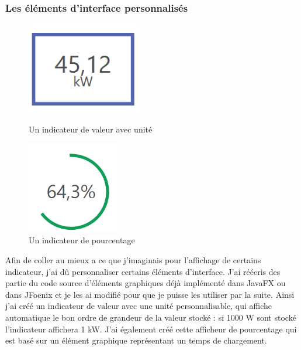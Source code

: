 \subsubsection{Les éléments d'interface personnalisés}
\begin{figure}[h!]
	\begin{minipage}{0.48\textwidth}
		\centering
		\includegraphics[height=4cm]{partie2/images/customcontrol1.png}
		\caption{Un indicateur de valeur avec unité}
	\end{minipage}\hfill
	\begin{minipage}{0.48\textwidth}
		\centering
		\includegraphics[height=4cm]{partie2/images/customcontrol2.png}
		\caption{Un indicateur de pourcentage}
	\end{minipage}\hfill
\end{figure}

Afin de coller au mieux a ce que j'imaginais pour l'affichage de certains indicateur, j'ai dû personnaliser certains éléments d'interface. J'ai réécris des partie du code source d'éléments graphiques déjà implémenté dans JavaFX ou dans JFoenix et je les ai modifié pour que je puisse les utiliser par la suite. Ainsi j'ai créé un indicateur de valeur avec une unité personnalisable, qui affiche automatique le bon ordre de grandeur de la valeur stocké : si 1000 W sont stocké  l'indicateur affichera 1 kW. J'ai également créé cette afficheur de pourcentage qui est basé sur un élément graphique représentant un temps de chargement.

